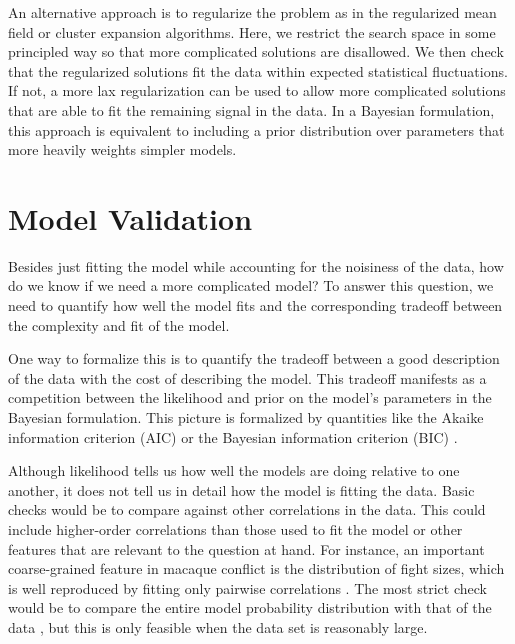 \documentclass[aps,prl,twocolumn,nofootinbib]{revtex4-1}
\begin{document}
An alternative approach is to regularize the problem as in the regularized mean field or cluster expansion algorithms. Here, we restrict the search space in some principled way so that more complicated
solutions are disallowed.  We then check that the regularized solutions fit the
data within expected statistical fluctuations.  If not, a more lax regularization
can be used to allow more complicated solutions that are able to fit the
remaining signal in the data. 
In a Bayesian formulation, this approach is equivalent to including a prior distribution over  parameters that more heavily weights simpler models.

\section{Model Validation}
Besides just fitting the model while accounting for the noisiness of the data, how do we know if we need a more complicated model? To answer this question, we need to quantify how well the model fits and the corresponding tradeoff between the complexity and fit of the model.

One way to formalize this is to quantify the tradeoff between a good description of the data with the cost of describing the model. This tradeoff manifests as a competition between the likelihood and prior on the model's parameters in the Bayesian formulation.
This picture is formalized by quantities like the Akaike information criterion (AIC) or the Bayesian information criterion (BIC) \cite{Anonymous:mVL3xTtr}.

Although likelihood tells us how well the models are doing relative to one another, it does not tell us in detail how the model is fitting the data.
Basic checks would be to compare against other correlations in the data.  This could include higher-order correlations than those used to fit the model or other features that are relevant to the question at hand. For instance, an important coarse-grained feature in  macaque conflict is the distribution of fight sizes, which is well reproduced by fitting only pairwise correlations \cite{Daniels:1cq}.
The most strict check would be to compare the entire model probability distribution with that of the data \cite{Lee:2015ev}, but this is only feasible when the data set is reasonably large.
\end{document}
